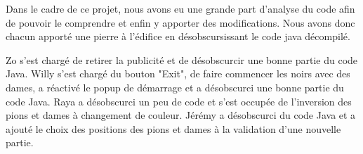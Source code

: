 
Dans le cadre de ce projet, nous avons eu une grande part d'analyse du code afin
de pouvoir le comprendre et enfin y apporter des modifications.
Nous avons donc chacun apporté une pierre à l'édifice en désobscursissant le code java décompilé.

Zo s'est chargé de retirer la publicité et de désobscurcir une bonne partie du code Java.
Willy s'est chargé du bouton "Exit", de faire commencer les noirs avec des dames,
a réactivé le popup de démarrage et a désobscurci une bonne partie du code Java.
Raya a désobscurci un peu de code et s'est occupée de l'inversion des pions et dames à changement de couleur.
Jérémy a désobscurci du code Java et a ajouté le choix des positions des pions et dames à la validation d'une nouvelle partie.


